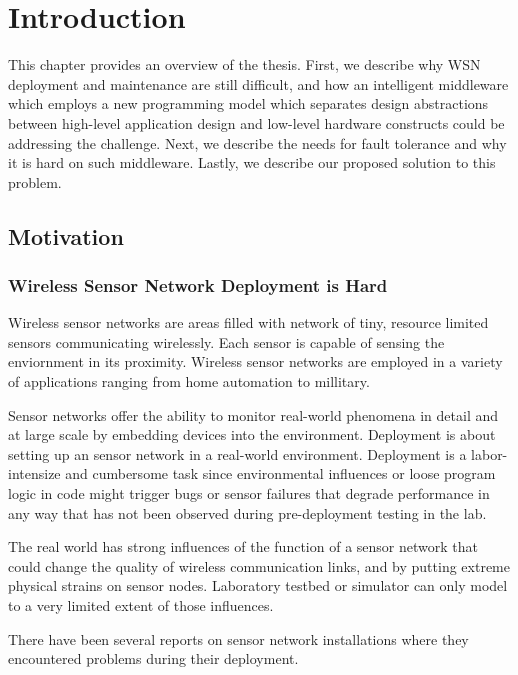 \chapter{Introduction}
\label{c:intro}

This chapter provides an overview of the thesis. First, we describe why
WSN deployment and maintenance are still difficult, and how 
an intelligent middleware which employs a new programming model which separates
design abstractions between high-level application design and low-level
hardware constructs could be addressing the challenge. Next, we describe
the needs for fault tolerance and why it is hard on such middleware. Lastly, we
describe our proposed solution to this problem.

\section{Motivation}

\subsection{Wireless Sensor Network Deployment is Hard}

Wireless sensor networks are areas filled with network of tiny, resource
limited sensors communicating wirelessly. Each sensor is capable of sensing the
enviornment in its proximity. Wireless sensor networks are employed in
a variety of applications ranging from home automation to millitary.

Sensor networks offer the ability to monitor real-world phenomena in detail and
at large scale by embedding devices into the environment. Deployment is
about setting up an sensor network in a real-world environment. Deployment is
a labor-intensize and cumbersome task since environmental influences or
loose program logic in code might trigger bugs or sensor failures that
degrade performance in any way that has not been observed during pre-deployment
testing in the lab.

The real world has strong influences of the function of a sensor network that
could change the quality of wireless communication links, and by putting
extreme physical strains on sensor nodes. Laboratory testbed or simulator can 
only model to a very limited extent of those influences.

There have been several reports on sensor network installations where they
encountered problems during their
deployment\cite{Barrenetxea2008}\cite{Polastre2004}\cite{Arora2004}\cite{Tateson2005}\cite{Padhy2005}\cite{Stoianov2007}\cite{Tolle2005}\cite{Werner-Allen2006a}.

